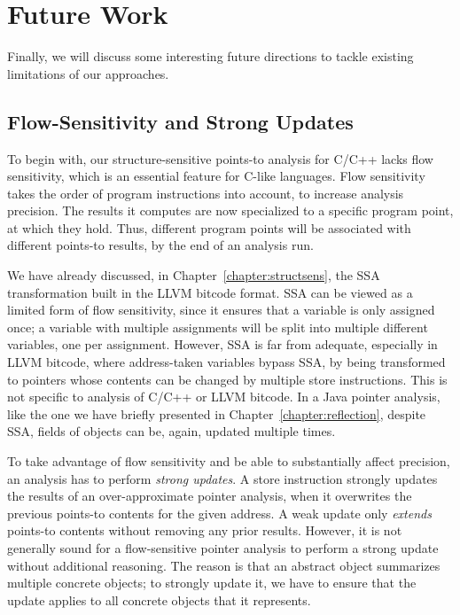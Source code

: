 

\section{Future Work}

Finally, we will discuss some interesting future directions to tackle
existing limitations of our approaches.

\subsection{Flow-Sensitivity and Strong Updates}

To begin with, our structure-sensitive points-to analysis for C/C++
lacks flow sensitivity, which is an essential feature for C-like
languages. Flow sensitivity takes the order of program instructions
into account, to increase analysis precision. The results it computes
are now specialized to a specific program point, at which they
hold. Thus, different program points will be associated with different
points-to results, by the end of an analysis run.

We have already discussed, in Chapter~\ref{chapter:structsens}, the
SSA transformation built in the LLVM bitcode format. SSA can be viewed
as a limited form of flow sensitivity, since it ensures that a
variable is only assigned once; a variable with multiple assignments
will be split into multiple different variables, one per assignment.
However, SSA is far from adequate, especially in LLVM bitcode, where
address-taken variables bypass SSA, by being transformed to pointers
whose contents can be changed by multiple store instructions. This is
not specific to analysis of C/C++ or LLVM bitcode. In a Java pointer
analysis, like the one we have briefly presented in
Chapter~\ref{chapter:reflection}, despite SSA, fields of objects can
be, again, updated multiple times.

To take advantage of flow sensitivity and be able to substantially
affect precision, an analysis has to perform \emph{strong updates}. A
store instruction strongly updates the results of an over-approximate
pointer analysis, when it overwrites the previous points-to contents
for the given address. A weak update only \emph{extends} points-to
contents without removing any prior results. However, it is not
generally sound for a flow-sensitive pointer analysis to perform a
strong update without additional reasoning. The reason is that an
abstract object summarizes multiple concrete objects; to strongly
update it, we have to ensure that the update applies to all concrete
objects that it represents.

